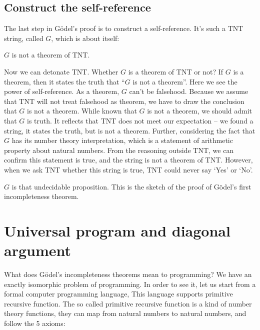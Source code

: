 \documentclass[b5paper]{article}
\begin{document}
\subsection{Construct the self-reference}

The last step in Gödel's proof is to construct a self-reference. It's such a TNT string, called $G$, which is about itself:

\begin{center}
$G$ is not a theorem of TNT.
\end{center}

Now we can detonate TNT. Whether $G$ is a theorem of TNT or not? If $G$ is a theorem, then it states the truth that ``$G$ is not a theorem''. Here we see the power of self-reference. As a theorem, $G$ can't be falsehood. Because we assume that TNT will not treat falsehood as theorem, we have to draw the conclusion that $G$ is not a theorem. While known that $G$ is not a theorem, we should admit that $G$ is truth. It reflects that TNT does not meet our expectation -- we found a string, it states the truth, but is not a theorem. Further, considering the fact that $G$ has its number theory interpretation, which is a statement of arithmetic property about natural numbers. From the reasoning outside TNT, we can confirm this statement is true, and the string is not a theorem of TNT. However, when we ask TNT whether this string is true, TNT could never say `Yes' or `No'.

$G$ is that undecidable proposition. This is the sketch of the proof of Gödel's first incompleteness theorem.

\section{Universal program and diagonal argument}
What does Gödel's incompleteness theorems mean to programming? We have an exactly isomorphic problem of programming. In order to see it, let us start from a formal computer programming language, This language supports primitive recursive function. The so called primitive recursive function is a kind of number theory functions, they can map from natural numbers to natural numbers, and follow the 5 axioms:
\end{document}
